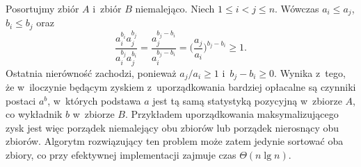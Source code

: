 \exercise %
Posortujmy zbiór $A$ i~zbiór $B$ niemalejąco.
Niech $1\le i<j\le n$.
Wówczas $a_i\le a_j$, $b_i\le b_j$ oraz
\[
	\frac{a_i^{b_i}a_j^{b_j}}{a_i^{b_j}a_j^{b_i}} = \frac{a_j^{b_j-b_i}}{a_i^{b_j-b_i}} = \biggl(\frac{a_j}{a_i}\biggr)^{b_j-b_i} \ge 1.
\]
Ostatnia nierówność zachodzi, ponieważ $a_j/a_i\ge1$ i~$b_j-b_i\ge0$.
Wynika z~tego, że w~iloczynie będącym zyskiem z~uporządkowania bardziej opłacalne są czynniki postaci $a^b$, w~których podstawa $a$ jest tą samą statystyką pozycyjną w~zbiorze $A$, co wykładnik $b$ w~zbiorze $B$.
Przykładem uporządkowania maksymalizującego zysk jest więc porządek niemalejący obu zbiorów lub porządek nierosnący obu zbiorów.
Algorytm rozwiązujący ten problem może zatem jedynie sortować oba zbiory, co przy efektywnej implementacji zajmuje czas $\Theta(n\lg n)$.
